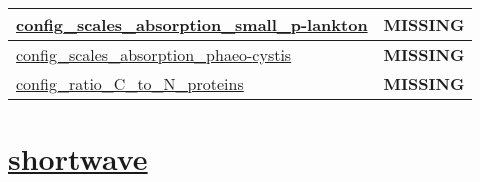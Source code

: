 {\begin{center}
\begin{longtable}{| p{2.0in} || p{4.0in} |}
    \hline
    \hyperref[subsec:nm_sec_config_scales_absorption_small_plankton]{config\_scales\_absorption\_small\_p-}\hyperref[subsec:nm_sec_config_scales_absorption_small_plankton]{lankton}& {\bf \color{red} MISSING} \\
    \hline
    \hyperref[subsec:nm_sec_config_scales_absorption_phaeocystis]{config\_scales\_absorption\_phaeo-}\hyperref[subsec:nm_sec_config_scales_absorption_phaeocystis]{cystis}& {\bf \color{red} MISSING} \\
    \hline
    \hyperref[subsec:nm_sec_config_ratio_C_to_N_proteins]{config\_ratio\_C\_to\_N\_proteins} & {\bf \color{red} MISSING} \\
    \hline
\end{longtable}
\end{center}
}
\section[shortwave]{\hyperref[sec:nm_sec_shortwave]{shortwave}}
\label{sec:nm_tab_shortwave}

\vspace{0.5in}
